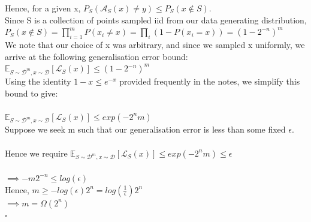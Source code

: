 \documentclass[12pt]{article}
\begin{document}
\begin{itemize}
    Hence, for a given x, $P_{S}(\mathcal{A}_{S}(x) \ne y) \le P_{S}(x \notin S)$.\\

    Since S is a collection of points sampled iid from our data generating distribution, \\
    $P_{S}(x \notin S) = \prod_{i=1}^{m}P(x_{i} \ne x) = \prod_{i}(1 - P(x_{i} = x)) = (1 - 2^{-n})^{m}$\\

    We note that our choice of x was arbitrary, and since we sampled x uniformly, we arrive at the 
    following generalisation error bound:\\

    $\mathbb{E}_{S \sim \mathcal{D}^{m}, x \sim \mathcal{D}}[\mathcal{L}_{S}(x)] \le (1 - 2^{-n})^{m} $\\
    Using the identity $1-x \le e^{-x}$ provided frequently in the notes, we simplify this bound to give:
    \\
    \\

    $\mathbb{E}_{S \sim \mathcal{D}^{m}, x \sim \mathcal{D}}[\mathcal{L}_{S}(x)] \le exp(-2^{n}m)$
    \\
    Suppose we seek m such that our generalisation error is less than some fixed $\epsilon$. \\
    \\
    Hence we require $\mathbb{E}_{S \sim \mathcal{D}^{m}, x \sim \mathcal{D}}[\mathcal{L}_{S}(x)] \le exp(-2^{n}m) \le \epsilon$\\
    \\
    $\implies -m2^{-n} \le log(\epsilon)$\\

    Hence, $m \ge -log(\epsilon)2^{n} = log(\frac{1}{\epsilon}) 2^{n}$\\

    $\implies m = \Omega(2^{n})$\\
    $\square$
\end{itemize}
\end{document}
